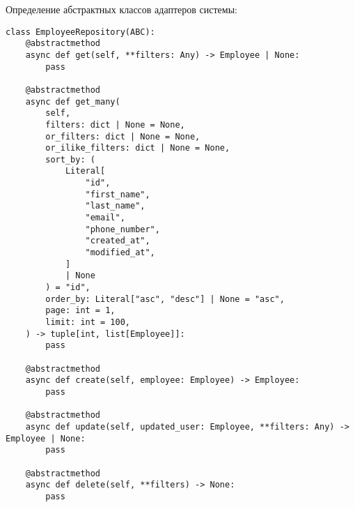 \noindent
Определение абстрактных классов адаптеров системы:

\begin{lstlisting}[style=pythonstyle]
class EmployeeRepository(ABC):
    @abstractmethod
    async def get(self, **filters: Any) -> Employee | None:
        pass

    @abstractmethod
    async def get_many(
        self,
        filters: dict | None = None,
        or_filters: dict | None = None,
        or_ilike_filters: dict | None = None,
        sort_by: (
            Literal[
                "id",
                "first_name",
                "last_name",
                "email",
                "phone_number",
                "created_at",
                "modified_at",
            ]
            | None
        ) = "id",
        order_by: Literal["asc", "desc"] | None = "asc",
        page: int = 1,
        limit: int = 100,
    ) -> tuple[int, list[Employee]]:
        pass

    @abstractmethod
    async def create(self, employee: Employee) -> Employee:
        pass

    @abstractmethod
    async def update(self, updated_user: Employee, **filters: Any) -> Employee | None:
        pass

    @abstractmethod
    async def delete(self, **filters) -> None:
        pass
\end{lstlisting}
